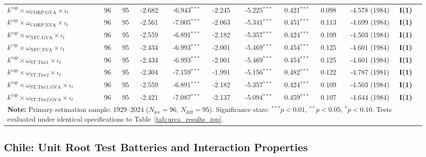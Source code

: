 \begin{landscape}
\begin{table}[h!]
\begin{tabular}{p{5.8cm} p{0.6cm} p{0.6cm} p{1.4cm} p{1.4cm} p{1.4cm} p{1.4cm} p{1.4cm} p{1.4cm} p{2.2cm} p{2.2cm}}
$k^{\text{cap}} \times \omega_{\text{CORP,GVA}} \times \iota_t$ & 96 & 95 & -2.682 & -6.943$^{***}$ & -2.245 & -5.225$^{***}$ & 0.421$^{***}$ & 0.098 & -4.578 (1984) & \textbf{I(1)} \\
$k^{\text{cap}} \times \omega_{\text{CORP,NVA}} \times \iota_t$ & 96 & 95 & -2.561 & -7.005$^{***}$ & -2.063 & -5.341$^{***}$ & 0.451$^{***}$ & 0.113 & -4.699 (1984) & \textbf{I(1)} \\
$k^{\text{cap}} \times \omega_{\text{NFC,GVA}} \times \iota_t$ & 96 & 95 & -2.559 & -6.891$^{***}$ & -2.182 & -5.357$^{***}$ & 0.424$^{***}$ & 0.109 & -4.503 (1984) & \textbf{I(1)} \\
$k^{\text{cap}} \times \omega_{\text{NFC,NVA}} \times \iota_t$ & 96 & 95 & -2.434 & -6.993$^{***}$ & -2.001 & -5.469$^{***}$ & 0.454$^{***}$ & 0.125 & -4.601 (1984) & \textbf{I(1)} \\
$k^{\text{cap}} \times \omega_{\text{ST,Tier1}} \times \iota_t$ & 96 & 95 & -2.434 & -6.993$^{***}$ & -2.001 & -5.469$^{***}$ & 0.454$^{***}$ & 0.125 & -4.601 (1984) & \textbf{I(1)} \\
$k^{\text{cap}} \times \omega_{\text{ST,Tier2}} \times \iota_t$ & 96 & 95 & -2.304 & -7.159$^{***}$ & -1.991 & -5.156$^{***}$ & 0.482$^{***}$ & 0.122 & -4.787 (1981) & \textbf{I(1)} \\
$k^{\text{cap}} \times \omega_{\text{ST,Tier1,GVA}} \times \iota_t$ & 96 & 95 & -2.559 & -6.891$^{***}$ & -2.182 & -5.357$^{***}$ & 0.424$^{***}$ & 0.109 & -4.503 (1984) & \textbf{I(1)} \\
$k^{\text{cap}} \times \omega_{\text{ST,Tier2,GVA}} \times \iota_t$ & 96 & 95 & -2.421 & -7.087$^{***}$ & -2.137 & -5.094$^{***}$ & 0.459$^{***}$ & 0.107 & -4.644 (1984) & \textbf{I(1)} \\
\bottomrule
\multicolumn{11}{p{22.0cm}}{\footnotesize \textbf{Note:} Primary estimation sample: 1929--2024 ($N_{\text{lev}}=96$, $N_{\text{diff}}=95$). Significance stars: $^{***} p < 0.01$, $^{**} p < 0.05$, $^{*} p < 0.10$. Tests evaluated under identical specifications to Table~\ref{tab:urca_results_ipp}.}
\end{tabular}
\end{table}
\end{landscape}

\FloatBarrier
\subsection{Chile: Unit Root Test Batteries and Interaction Properties}

